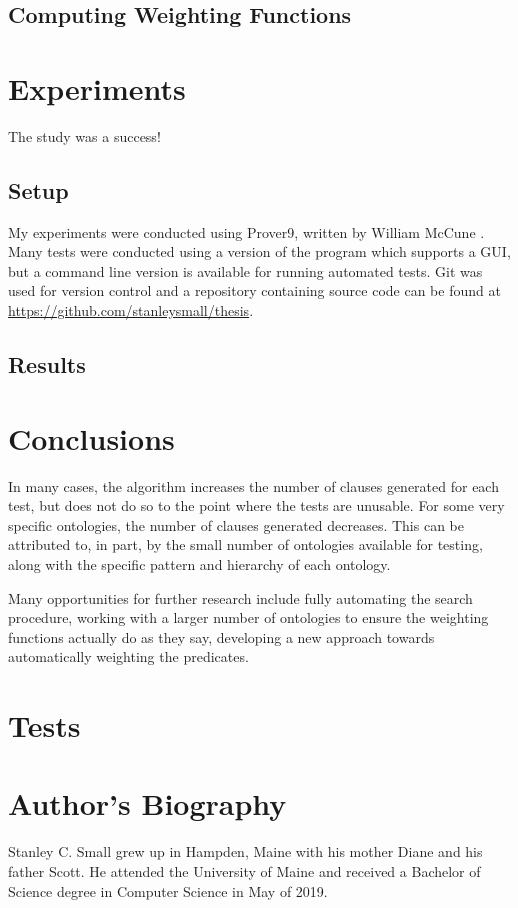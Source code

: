 \documentclass{article}
\begin{document}
		\subsection{Computing Weighting Functions}

	\newpage
	\section{Experiments}
The study was a success!

		\subsection{Setup}
		My experiments were conducted using Prover9, written by William McCune \cite{mccune2005prover9}. Many tests were conducted using a version of the program which supports a GUI, but a command line version is available for running automated tests. 
Git was used for version control and a repository containing source code can be found at \url{https://github.com/stanleysmall/thesis}.
		\subsection{Results}
	\newpage
	\section{Conclusions}

In many cases, the algorithm increases the number of clauses generated for each test, but does not do so to the point where the tests are unusable. For some very specific ontologies, the number of clauses generated decreases. This can be attributed to, in part, by the small number of ontologies available for testing, along with the specific pattern and hierarchy of each ontology. 

Many opportunities for further research include fully automating the search procedure, working with a larger number of ontologies to ensure the weighting functions actually do as they say, developing a new approach towards automatically weighting the predicates. 
	\newpage
	\printbibliography

	\newpage
	\appendix

	\section{Tests}

	\newpage
	\section*{Author's Biography}
Stanley C. Small grew up in Hampden, Maine with his mother Diane and his father Scott. He attended the University of Maine and received a Bachelor of Science degree in Computer Science in May of 2019. 
\end{document}
